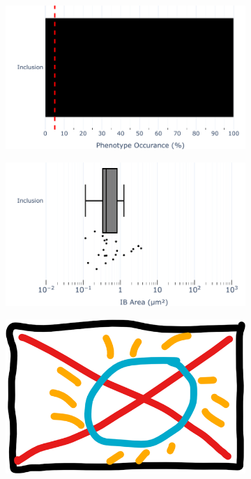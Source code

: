 \begin{figure}
    \begin{subfigure}{0.5\textwidth}
        \caption{}
        \includegraphics[width=1\linewidth]{10. Chapter 5/Figs/03. IFIT2-FLAG/03. IFIT2F/01. pIB/07. bar_bi2f_bnbp.pdf} 
    \end{subfigure}
    \begin{subfigure}{0.5\textwidth}
        \caption{}
        \includegraphics[width=1\linewidth]{10. Chapter 5/Figs/03. IFIT2-FLAG/03. IFIT2F/01. pIB/08. box_bi2f_bnbp.pdf}
    \end{subfigure}
    \begin{subfigure}{1\textwidth}
        \centering
        \caption{}
        \includegraphics[width=1\linewidth]{10. Chapter 5/Figs/00. placeholder.png}

\end{subfigure}
\end{figure}
